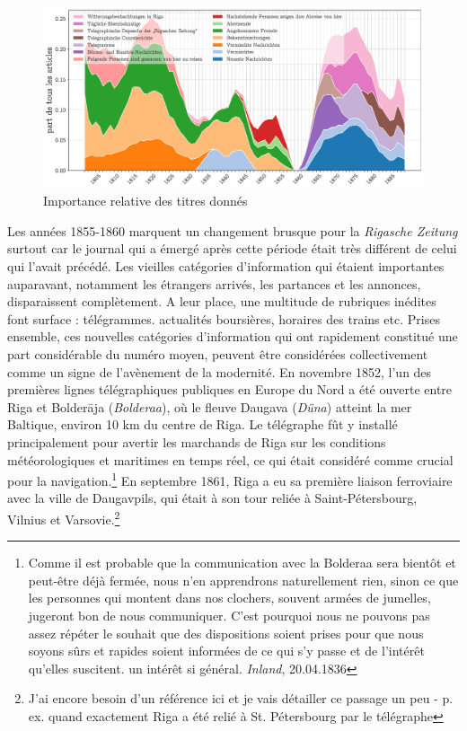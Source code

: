 \documentclass[a4paper,twoside,12pt]{article}
\begin{document}
\begin{figure}[h]
\centering
\captionsetup{justification=centering}
\includegraphics[width=\textwidth]{images/headings_other.pdf}
\caption{Importance relative des titres donnés}
\label{fig:headings_other}
\end{figure}

Les années 1855-1860 marquent un changement brusque pour la \textit{Rigasche Zeitung} surtout car le journal qui a émergé après cette période était très différent de celui qui l'avait précédé. Les vieilles catégories d'information qui étaient importantes auparavant, notamment les étrangers arrivés, les partances et les annonces, disparaissent complètement. A leur place, une multitude de rubriques inédites font surface : télégrammes. actualités boursières, horaires des trains etc. Prises ensemble, ces nouvelles catégories d'information qui ont rapidement constitué une part considérable du numéro moyen, peuvent être considérées collectivement comme un signe de l'avènement de la modernité. En novembre 1852, l'un des premières lignes télégraphiques publiques en Europe du Nord a été ouverte entre Riga et Bolderāja (\textit{Bolderaa}), où le fleuve Daugava (\textit{Düna}) atteint la mer Baltique, environ 10 km du centre de Riga. Le télégraphe fût y installé principalement pour avertir les marchands de Riga sur les conditions météorologiques et maritimes en temps réel, ce qui était considéré comme crucial pour la navigation.\footnote{\og Comme il est probable que la communication avec la Bolderaa sera bientôt et peut-être déjà fermée, nous n'en apprendrons naturellement rien, sinon ce que les personnes qui montent dans nos clochers, souvent armées de jumelles, jugeront bon de nous communiquer. C'est pourquoi nous ne pouvons pas assez répéter le souhait que des dispositions soient prises pour que nous soyons sûrs et rapides soient informées de ce qui s'y passe et de l'intérêt qu'elles suscitent. un intérêt si général. \fg{} \textit{Inland}, 20.04.1836} En septembre 1861, Riga a eu sa première liaison ferroviaire avec la ville de Daugavpils, qui était à son tour reliée à Saint-Pétersbourg, Vilnius et Varsovie.\footnote{J'ai encore besoin d'un référence ici et je vais détailler ce passage un peu - p. ex. quand exactement Riga a été relié à St. Pétersbourg par le télégraphe}
\end{document}
